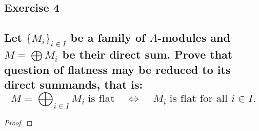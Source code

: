 \subsection*{Exercise 4}
\subsection*{%
Let $\{M_i\}_{i\in I}$ be a family of $A$-modules and $M=\bigoplus M_i$ be their direct sum.
Prove that question of flatness may be reduced to its direct summands, that is:
\[
	M=\bigoplus_{i\in I} M_i \;\text{is flat} \quad\iff\quad M_i \;\text{is flat for all $i\in I$}.
\]
} 

\begin{proof}%


%
\end{proof}%

